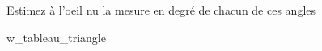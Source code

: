 \begin{exo}
    Estimez à l'oeil nu la mesure en degré de chacun de ces angles 
\end{exo}

    {w_tableau_triangle}


